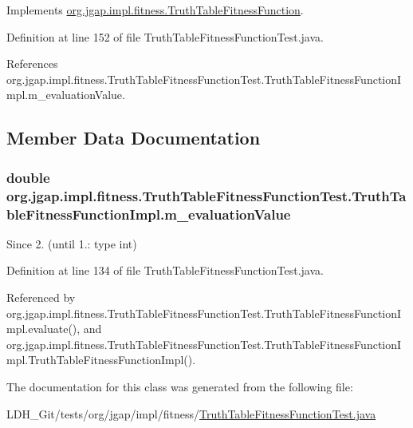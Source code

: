 Implements \hyperlink{classorg_1_1jgap_1_1impl_1_1fitness_1_1_truth_table_fitness_function_a3f159f68ac2f247c18d1e62ff030c56c}{org.\-jgap.\-impl.\-fitness.\-Truth\-Table\-Fitness\-Function}.



Definition at line 152 of file Truth\-Table\-Fitness\-Function\-Test.\-java.



References org.\-jgap.\-impl.\-fitness.\-Truth\-Table\-Fitness\-Function\-Test.\-Truth\-Table\-Fitness\-Function\-Impl.\-m\-\_\-evaluation\-Value.



\subsection{Member Data Documentation}
\hypertarget{classorg_1_1jgap_1_1impl_1_1fitness_1_1_truth_table_fitness_function_test_1_1_truth_table_fitness_function_impl_acddf969386c05548fa583d83d7da761a}{
\subsubsection[{m\-\_\-evaluation\-Value}]{\setlength{\rightskip}{0pt plus 5cm}double org.\-jgap.\-impl.\-fitness.\-Truth\-Table\-Fitness\-Function\-Test.\-Truth\-Table\-Fitness\-Function\-Impl.\-m\-\_\-evaluation\-Value\hspace{0.3cm}{\ttfamily [private]}}}\label{classorg_1_1jgap_1_1impl_1_1fitness_1_1_truth_table_fitness_function_test_1_1_truth_table_fitness_function_impl_acddf969386c05548fa583d83d7da761a}
\begin{DoxySince}{Since}
2. (until 1.\-: type int) 
\end{DoxySince}


Definition at line 134 of file Truth\-Table\-Fitness\-Function\-Test.\-java.



Referenced by org.\-jgap.\-impl.\-fitness.\-Truth\-Table\-Fitness\-Function\-Test.\-Truth\-Table\-Fitness\-Function\-Impl.\-evaluate(), and org.\-jgap.\-impl.\-fitness.\-Truth\-Table\-Fitness\-Function\-Test.\-Truth\-Table\-Fitness\-Function\-Impl.\-Truth\-Table\-Fitness\-Function\-Impl().



The documentation for this class was generated from the following file\-:\begin{DoxyCompactItemize}
\item 
L\-D\-H\-\_\-\-Git/tests/org/jgap/impl/fitness/\hyperlink{_truth_table_fitness_function_test_8java}{Truth\-Table\-Fitness\-Function\-Test.\-java}\end{DoxyCompactItemize}
